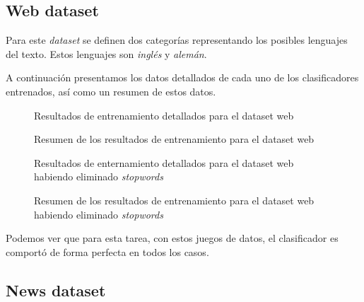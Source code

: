 \documentclass[a4paper,10pt]{article}
\begin{document}
\subsection{\textsf{Web} dataset}

Para este \emph{dataset} se definen dos categorías representando los posibles lenguajes del texto. Estos lenguajes son \emph{inglés} y \emph{alemán}.

A continuación presentamos los datos detallados de cada uno de los clasificadores entrenados, así como un resumen de estos datos.

\begin{multicols}{2}
\begin{figure}[H]
    \centering
    
    \caption{Resultados de entrenamiento detallados para el dataset \textsf{web}}
\end{figure}
\begin{figure}[H]
    \centering
    \begin{minipage}{0.35\textwidth}
    
    \end{minipage}
    \caption{Resumen de los resultados de entrenamiento para el dataset \textsf{web}}
\end{figure}

\begin{figure}[H]
    \centering
    
    \caption{Resultados de enternamiento detallados para el dataset \textsf{web} habiendo eliminado \emph{stopwords}}
\end{figure}
\begin{figure}[H]
    \centering
    \begin{minipage}{0.35\textwidth}
    
    \end{minipage}
    \caption{Resumen de los resultados de entrenamiento para el dataset \textsf{web} habiendo eliminado \emph{stopwords}}
\end{figure}
\end{multicols}
   
Podemos ver que para esta tarea, con estos juegos de datos, el clasificador es comportó de forma perfecta en todos los casos.

\subsection{\textsf{News} dataset}
\end{document}
